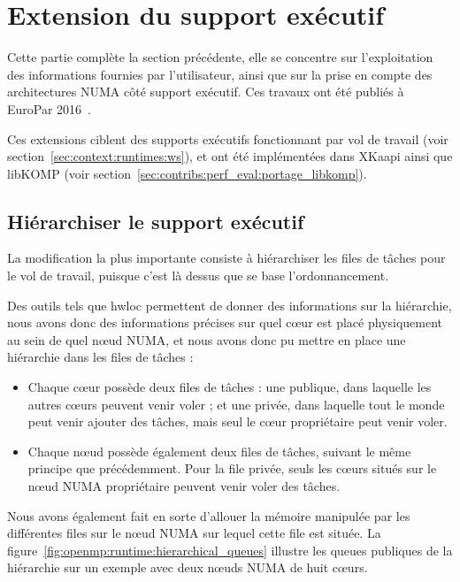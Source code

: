 \section{Extension du support exécutif}\label{sec:openmp:runtime}

Cette partie complète la section précédente, elle se concentre sur l'exploitation des informations fournies par l'utilisateur, ainsi que sur la prise en compte des architectures NUMA côté support exécutif.
Ces travaux ont été publiés à EuroPar 2016~\cite{Virouleau2016b}.

Ces extensions ciblent des supports exécutifs fonctionnant par vol de travail (voir section~\ref{sec:context:runtimes:ws}), et ont été implémentées dans XKaapi ainsi que libKOMP (voir section~\ref{sec:contribs:perf_eval:portage_libkomp}).

\subsection{Hiérarchiser le support exécutif}

La modification la plus importante consiste à hiérarchiser les files de tâches pour le vol de travail, puisque c'est là dessus que se base l'ordonnancement.

Des outils tels que hwloc permettent de donner des informations sur la hiérarchie, nous avons donc des informations précises sur quel cœur est placé physiquement au sein de quel nœud NUMA, et nous avons donc pu mettre en place une hiérarchie dans les files de tâches :

\begin{itemize}
  \item Chaque cœur possède deux files de tâches : une publique, dans laquelle les autres cœurs peuvent venir voler ; et une privée, dans laquelle tout le monde peut venir ajouter des tâches, mais seul le cœur propriétaire peut venir voler.
  \item Chaque nœud possède également deux files de tâches, suivant le même principe que précédemment. Pour la file privée, seuls les cœurs situés sur le nœud NUMA propriétaire peuvent venir voler des tâches.
\end{itemize}

Nous avons également fait en sorte d'allouer la mémoire manipulée par les différentes files sur le nœud NUMA sur lequel cette file est située.
La figure~\ref{fig:openmp:runtime:hierarchical_queues} illustre les queues publiques de la hiérarchie sur un exemple avec deux nœuds NUMA de huit cœurs.

